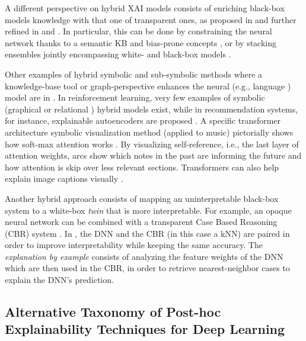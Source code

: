 \documentclass[final]{elsarticle}
\begin{document}
A different perspective on hybrid XAI models consists of enriching black-box models knowledge with that one of transparent ones, as proposed in \cite{WhatDoesExplainableAImean} and further refined in \cite{Bennetot19} {\color{black}and \cite{loyola2019black}. In particular, this can be done by constraining the neural network thanks to a semantic KB and bias-prone concepts \cite{Bennetot19}, or by stacking ensembles jointly encompassing white- and black-box models \cite{loyola2019black}.} 

Other examples of hybrid symbolic and sub-symbolic methods where a knowledge-base tool or graph-perspective enhances the neural (e.g., language \cite{petroni2019language}) model are in \cite{Bollacker19,Shang19}. In reinforcement learning, very few examples of symbolic (graphical \cite{Zolotas19} or relational  \cite{santoro2017simple,garnelo2016towards}) hybrid models exist, while in recommendation systems, for instance, explainable autoencoders are proposed \cite{Bellini18}. A specific transformer architecture symbolic visualization method (applied to music) pictorially shows how soft-max attention works \cite{huang2018music}. By visualizing self-reference, i.e., the last layer of attention weights, arcs show which notes in the past are informing the future and how attention is skip over less relevant sections. Transformers can also help explain image captions visually \cite{cornia2019smart}. 

Another hybrid approach consists of mapping an uninterpretable black-box system to a white-box \textit{twin} that is more interpretable. For example, an opaque neural network can be combined with a transparent Case Based Reasoning (CBR) system \cite{Aamodt94, Caruana99}. In \cite{Keane19}, the DNN and the CBR (in this case a kNN) are paired in order to improve interpretability while keeping the same accuracy. The \textit{explanation by example} consists of analyzing the feature weights of the DNN which are then used in the CBR, in order to retrieve nearest-neighbor cases to explain the DNN’s prediction. 

\subsection{Alternative Taxonomy of Post-hoc Explainability Techniques for Deep Learning} \label{ssec:second_tax}
\end{document}
